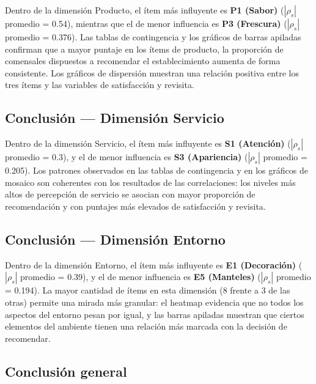 \documentclass[
  spanish,
]{article}
\begin{document}
Dentro de la dimensión Producto, el ítem más influyente es \textbf{P1
(Sabor)} (\(|\rho_s|\) promedio = 0.54), mientras que el de menor
influencia es \textbf{P3 (Frescura)} (\(|\rho_s|\) promedio = 0.376).
Las tablas de contingencia y los gráficos de barras apiladas confirman
que a mayor puntaje en los ítems de producto, la proporción de
comensales dispuestos a recomendar el establecimiento aumenta de forma
consistente. Los gráficos de dispersión muestran una relación positiva
entre los tres ítems y las variables de satisfacción y revisita.

\subsection{Conclusión --- Dimensión
Servicio}\label{conclusiuxf3n-dimensiuxf3n-servicio}

Dentro de la dimensión Servicio, el ítem más influyente es \textbf{S1
(Atención)} (\(|\rho_s|\) promedio = 0.3), y el de menor influencia es
\textbf{S3 (Apariencia)} (\(|\rho_s|\) promedio = 0.205). Los patrones
observados en las tablas de contingencia y en los gráficos de mosaico
son coherentes con los resultados de las correlaciones: los niveles más
altos de percepción de servicio se asocian con mayor proporción de
recomendación y con puntajes más elevados de satisfacción y revisita.

\subsection{Conclusión --- Dimensión
Entorno}\label{conclusiuxf3n-dimensiuxf3n-entorno}

Dentro de la dimensión Entorno, el ítem más influyente es \textbf{E1
(Decoración)} (\(|\rho_s|\) promedio = 0.39), y el de menor influencia
es \textbf{E5 (Manteles)} (\(|\rho_s|\) promedio = 0.194). La mayor
cantidad de ítems en esta dimensión (8 frente a 3 de las otras) permite
una mirada más granular: el heatmap evidencia que no todos los aspectos
del entorno pesan por igual, y las barras apiladas muestran que ciertos
elementos del ambiente tienen una relación más marcada con la decisión
de recomendar.

\subsection{Conclusión general}\label{conclusiuxf3n-general}
\end{document}
